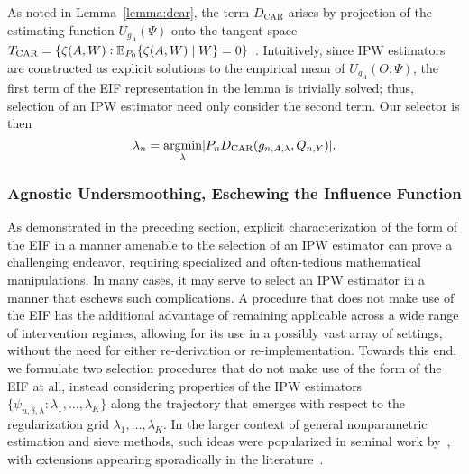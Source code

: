 As noted in Lemma~\ref{lemma:dcar}, the term $D_{\text{CAR}}$ arises by
projection of the estimating function $U_{g_A}(\Psi)$ onto the tangent space
$T_{\text{CAR}} = \{\zeta(A,W): \mathbb{E}_{P_0} \{\zeta(A,W) \mid W \} =
0\}$~\citep{robins1994estimation,vdl2003unified}. Intuitively, since
IPW estimators are constructed as explicit solutions to the empirical mean of
$U_{g_A}(O; \Psi)$, the first term of the EIF representation in the lemma is
trivially solved; thus, selection of an IPW estimator need only consider the
second term. Our selector is then
\begin{equation*}
  \lambda_n = \operatorname*{\arg\!\min}_{\lambda} \lvert P_n D_{\text{CAR}}(g_{n,A,\lambda},
    Q_{n,Y}) \rvert .
\end{equation*}

\subsubsection{Agnostic Undersmoothing, Eschewing the Influence Function}

As demonstrated in the preceding section, explicit characterization of the form
of the EIF in a manner amenable to the selection of an IPW estimator can prove
a challenging endeavor, requiring specialized and often-tedious mathematical
manipulations. In many cases, it may serve to select an IPW estimator in
a manner that eschews such complications. A procedure that does not make use of
the EIF has the additional advantage of remaining applicable across a wide range
of intervention regimes, allowing for its use in a possibly vast array of
settings, without the need for either re-derivation or re-implementation.
Towards this end, we formulate two selection procedures that do not make use of
the form of the EIF at all, instead considering properties of the IPW estimators
$\{\psi_{n,\delta,\lambda}: \lambda_1, \ldots, \lambda_K \}$ along the
trajectory that emerges with respect to the regularization grid $\lambda_1,
\ldots, \lambda_K$. In the larger context of general nonparametric estimation
and sieve methods, such ideas were popularized in seminal work
by~\citet{lepskii1991problem,lepskii1992asymptotically}, with extensions
appearing sporadically in the literature~\citep[e.g.,][]{lepskii1997optimal,
birge2001alternative}.

